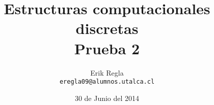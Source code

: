 \documentclass[11pt]{utalcaDoc}
\title{{\bf Estructuras computacionales discretas}\\Prueba 2}
\author{Erik Regla\\ \tt{eregla09@alumnos.utalca.cl}}
\date{30 de Junio del 2014}
\numberwithin{equation}{section}
\begin{document}
\renewcommand{\figurename}{Figura~}
\renewcommand{\tablename}{Tabla~}

\maketitle

			\newpage
			\newpage
			\newpage
\end{document}
